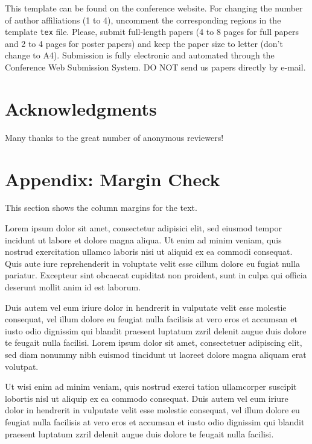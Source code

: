 \documentclass[a4paper]{article}
\begin{document}
This template can be found on the conference website. For changing the number
of author affiliations (1 to 4), uncomment the corresponding regions in the
template \texttt{tex} file. Please, submit full-length papers (4 to 8 pages
for full papers and 2 to 4 pages for poster papers) and keep the paper size to
letter (don't change to A4). Submission is fully electronic and automated 
through the Conference Web Submission System. DO NOT send us papers directly by 
e-mail.

\section{Acknowledgments}

Many thanks to the great number of anonymous reviewers!

\nocite{*}


\section{Appendix: Margin Check}

This section shows the column margins for the text.

Lorem ipsum dolor sit amet, consectetur adipisici elit, sed eiusmod tempor
incidunt ut labore et dolore magna aliqua. Ut enim ad minim veniam, quis
nostrud exercitation ullamco laboris nisi ut aliquid ex ea commodi consequat.
Quis aute iure reprehenderit in voluptate velit esse cillum dolore eu fugiat
nulla pariatur. Excepteur sint obcaecat cupiditat non proident, sunt in culpa
qui officia deserunt mollit anim id est laborum.

Duis autem vel eum iriure dolor in hendrerit in vulputate velit esse molestie
consequat, vel illum dolore eu feugiat nulla facilisis at vero eros et accumsan
et iusto odio dignissim qui blandit praesent luptatum zzril delenit augue duis
dolore te feugait nulla facilisi. Lorem ipsum dolor sit amet, consectetuer
adipiscing elit, sed diam nonummy nibh euismod tincidunt ut laoreet dolore
magna aliquam erat volutpat.

Ut wisi enim ad minim veniam, quis nostrud exerci tation ullamcorper suscipit
lobortis nisl ut aliquip ex ea commodo consequat. Duis autem vel eum iriure
dolor in hendrerit in vulputate velit esse molestie consequat, vel illum dolore
eu feugiat nulla facilisis at vero eros et accumsan et iusto odio dignissim qui
blandit praesent luptatum zzril delenit augue duis dolore te feugait nulla
facilisi.
\end{document}
